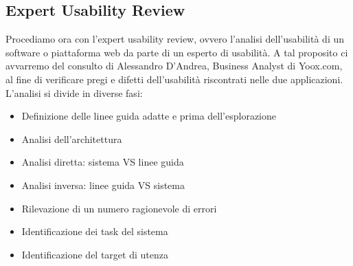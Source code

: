 \documentclass[12pt,a4paper,openright,twoside]{article}
\begin{document}
\subsection{Expert Usability Review}
Procediamo ora con l'expert usability review, ovvero l'analisi dell'usabilità di un software o piattaforma web da parte di un esperto di usabilità. A tal proposito ci avvarremo del consulto di Alessandro D'Andrea, Business Analyst di Yoox.com, al fine di verificare pregi e difetti dell'usabilità riscontrati nelle due applicazioni.\\
L'analisi si divide in diverse fasi:
\begin{itemize}
\item Definizione delle linee guida adatte e prima dell'esplorazione
\item Analisi dell'architettura
\item Analisi diretta: sistema VS linee guida
\item Analisi inversa: linee guida VS sistema
\item Rilevazione di un numero ragionevole di errori
\item Identificazione dei task del sistema
\item Identificazione del target di utenza
\end{itemize}
\end{document}
